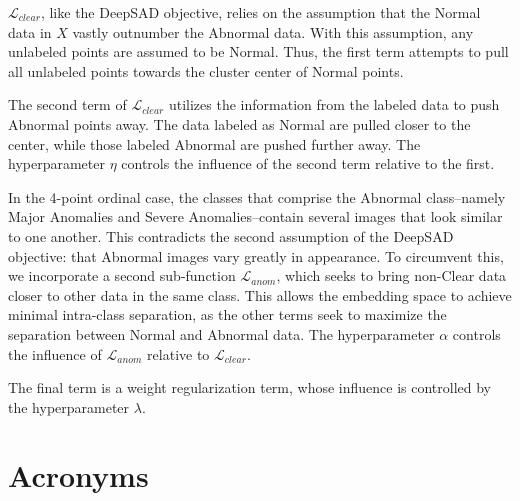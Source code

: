 \documentclass{article}
\begin{document}
$\mathcal{L}_{clear}$, like the \ac{DeepSAD} objective, relies on the assumption that the Normal data in $X$ vastly outnumber the Abnormal data. With this assumption, any unlabeled points are assumed to be Normal. Thus, the first term attempts to pull all unlabeled points towards the cluster center of Normal points.  

The second term of $\mathcal{L}_{clear}$ utilizes the information from the labeled data to push Abnormal points away. The data labeled as Normal are pulled closer to the center, while those labeled Abnormal are pushed further away. The hyperparameter $\eta$ controls the influence of the second term relative to the first.

In the 4-point ordinal case, the classes that comprise the Abnormal class--namely Major Anomalies and Severe Anomalies--contain several images that look similar to one another. This contradicts the second assumption of the \ac{DeepSAD} objective: that Abnormal images vary greatly in appearance. To circumvent this, we incorporate a second sub-function $\mathcal{L}_{anom}$, which seeks to bring non-Clear data closer to other data in the same class. This allows the embedding space to achieve minimal intra-class separation, as the other terms seek to maximize the separation between Normal and Abnormal data. The hyperparameter $\alpha$ controls the influence of $\mathcal{L}_{anom}$ relative to $\mathcal{L}_{clear}$. 

The final term is a weight regularization term, whose influence is controlled by the hyperparameter $\lambda$.

\section{Acronyms}

\begin{acronym}
\end{acronym}
\end{document}
